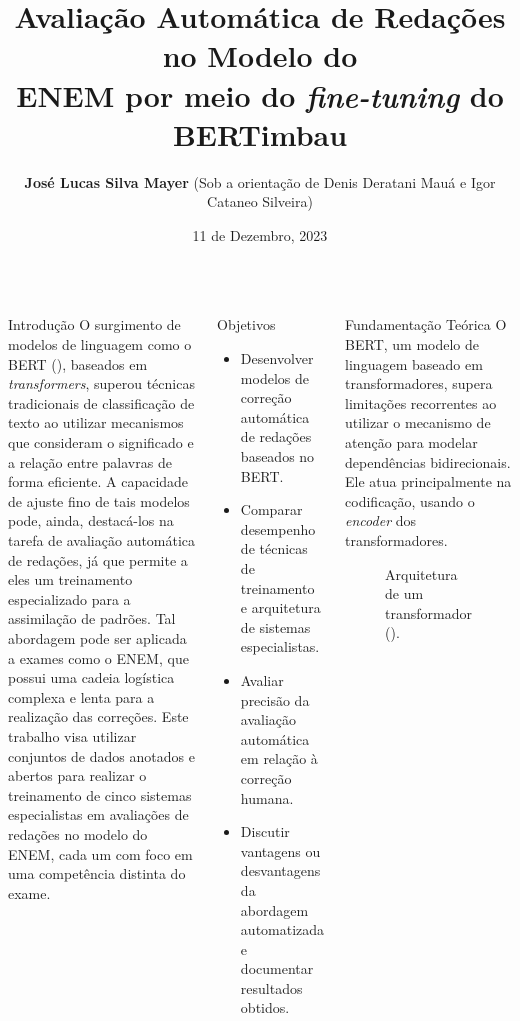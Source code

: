 \documentclass[
  xcolor={hyperref,svgnames,x11names,table},
  hyperref={pdfencoding=unicode,plainpages=false,pdfpagelabels=true,breaklinks=true},
  brazilian,english,
]{beamer}
\title[CCSL]{\vspace{10mm} Avaliação Automática de Redações no Modelo do \\ ENEM por meio do \textit{fine-tuning} do BERTimbau \vspace{10mm}}
\institute{Departamento de Ciência da Computação --- Universidade de São Paulo}
\author[josemayer@usp.br]{\textbf{José Lucas Silva Mayer} \tiny{(Sob a orientação de Denis Deratani Mauá e Igor Cataneo Silveira)}}
\date{11 de Dezembro, 2023}
\newcommand\halfcol{\column{.46\textwidth}}
\begin{document}

\begin{frame}[fragile]\centering

\vspace{-.5\baselineskip}

\begin{columns}[T]

    \halfcol

    \begin{block}{Introdução}
        O surgimento de modelos de linguagem como o BERT (\cite{bert2018}), baseados em \textit{transformers}, superou técnicas tradicionais de classificação de texto ao utilizar mecanismos que consideram o significado e a relação entre palavras de forma eficiente. A capacidade de ajuste fino de tais modelos pode, ainda, destacá-los na tarefa de avaliação automática de redações, já que permite a eles um treinamento especializado para a assimilação de padrões. Tal abordagem pode ser aplicada a exames como o ENEM, que possui uma cadeia logística complexa e lenta para a realização das correções. Este trabalho visa utilizar conjuntos de dados anotados e abertos para realizar o treinamento de cinco sistemas especialistas em avaliações de redações no modelo do ENEM, cada um com foco em uma competência distinta do exame.
    \end{block}

    \begin{block}{Objetivos}
        \begin{itemize}
            \item Desenvolver modelos de correção automática de redações baseados no BERT.
            \item Comparar desempenho de técnicas de treinamento e arquitetura de sistemas especialistas.
            \item Avaliar precisão da avaliação automática em relação à correção humana.
            \item Discutir vantagens ou desvantagens da abordagem automatizada e documentar resultados obtidos.
        \end{itemize}
    \end{block}

    \begin{block}{Fundamentação Teórica}
        O BERT, um modelo de linguagem baseado em transformadores, supera limitações recorrentes ao utilizar o mecanismo de atenção para modelar dependências bidirecionais. Ele atua principalmente na codificação, usando o \textit{encoder} dos transformadores.
        \begin{figure}[H]
            \centering
            
            \caption{Arquitetura de um transformador (\cite{attention2017}).}
            \label{fig:transformer}
        \end{figure}
    \end{block}


\end{columns}
\end{frame}
\end{document}
